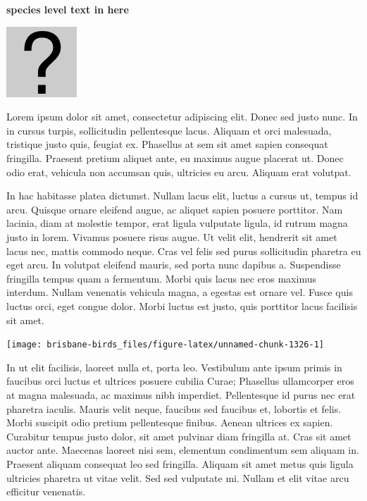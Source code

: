 \documentclass[]{book}
\let\origfigure\figure
\let\endorigfigure\endfigure
\renewenvironment{figure}[1][2] {
  \expandafter\origfigure\expandafter[H]
} {
  \endorigfigure
}
\begin{document}
\textbf{species level text in here}

\begin{figure}
\centering
\includegraphics{assets/missing.png}
\caption{No image for species}
\end{figure}

Lorem ipsum dolor sit amet, consectetur adipiscing elit. Donec sed justo
nunc. In in cursus turpis, sollicitudin pellentesque lacus. Aliquam et
orci malesuada, tristique justo quis, feugiat ex. Phasellus at sem sit
amet sapien consequat fringilla. Praesent pretium aliquet ante, eu
maximus augue placerat ut. Donec odio erat, vehicula non accumsan quis,
ultricies eu arcu. Aliquam erat volutpat.

In hac habitasse platea dictumst. Nullam lacus elit, luctus a cursus ut,
tempus id arcu. Quisque ornare eleifend augue, ac aliquet sapien posuere
porttitor. Nam lacinia, diam at molestie tempor, erat ligula vulputate
ligula, id rutrum magna justo in lorem. Vivamus posuere risus augue. Ut
velit elit, hendrerit sit amet lacus nec, mattis commodo neque. Cras vel
felis sed purus sollicitudin pharetra eu eget arcu. In volutpat eleifend
mauris, sed porta nunc dapibus a. Suspendisse fringilla tempus quam a
fermentum. Morbi quis lacus nec eros maximus interdum. Nullam venenatis
vehicula magna, a egestas est ornare vel. Fusce quis luctus orci, eget
congue dolor. Morbi luctus est justo, quis porttitor lacus facilisis sit
amet.

\begin{figure}
\texttt{[image: brisbane-birds\_files/figure-latex/unnamed-chunk-1326-1]} \caption{insert figure caption}\label{fig:unnamed-chunk-1326}
\end{figure}

In ut elit facilisis, laoreet nulla et, porta leo. Vestibulum ante ipsum
primis in faucibus orci luctus et ultrices posuere cubilia Curae;
Phasellus ullamcorper eros at magna malesuada, ac maximus nibh
imperdiet. Pellentesque id purus nec erat pharetra iaculis. Mauris velit
neque, faucibus sed faucibus et, lobortis et felis. Morbi suscipit odio
pretium pellentesque finibus. Aenean ultrices ex sapien. Curabitur
tempus justo dolor, sit amet pulvinar diam fringilla at. Cras sit amet
auctor ante. Maecenas laoreet nisi sem, elementum condimentum sem
aliquam in. Praesent aliquam consequat leo sed fringilla. Aliquam sit
amet metus quis ligula ultricies pharetra ut vitae velit. Sed sed
vulputate mi. Nullam et elit vitae arcu efficitur venenatis.
\end{document}
